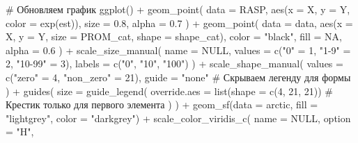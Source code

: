 \documentclass[
  letterpaper,
  DIV=11,
  numbers=noendperiod]{scrreprt}
\newenvironment{Shaded}{\begin{snugshade}}{\end{snugshade}}
\newcommand{\AttributeTok}[1]{\textcolor[rgb]{0.40,0.45,0.13}{#1}}
\newcommand{\CommentTok}[1]{\textcolor[rgb]{0.37,0.37,0.37}{#1}}
\newcommand{\ConstantTok}[1]{\textcolor[rgb]{0.56,0.35,0.01}{#1}}
\newcommand{\DecValTok}[1]{\textcolor[rgb]{0.68,0.00,0.00}{#1}}
\newcommand{\FloatTok}[1]{\textcolor[rgb]{0.68,0.00,0.00}{#1}}
\newcommand{\FunctionTok}[1]{\textcolor[rgb]{0.28,0.35,0.67}{#1}}
\newcommand{\NormalTok}[1]{\textcolor[rgb]{0.00,0.23,0.31}{#1}}
\newcommand{\OtherTok}[1]{\textcolor[rgb]{0.00,0.23,0.31}{#1}}
\newcommand{\SpecialCharTok}[1]{\textcolor[rgb]{0.37,0.37,0.37}{#1}}
\newcommand{\StringTok}[1]{\textcolor[rgb]{0.13,0.47,0.30}{#1}}
\begin{document}
\begin{Shaded}
\begin{Highlighting}[]
\CommentTok{\# Обновляем график}
\FunctionTok{ggplot}\NormalTok{() }\SpecialCharTok{+}
  \FunctionTok{geom\_point}\NormalTok{(}
    \AttributeTok{data =}\NormalTok{ RASP, }
    \FunctionTok{aes}\NormalTok{(}\AttributeTok{x =}\NormalTok{ X, }\AttributeTok{y =}\NormalTok{ Y, }\AttributeTok{color =} \FunctionTok{exp}\NormalTok{(est)), }
    \AttributeTok{size =} \FloatTok{0.8}\NormalTok{, }
    \AttributeTok{alpha =} \FloatTok{0.7}
\NormalTok{  ) }\SpecialCharTok{+} 
  \FunctionTok{geom\_point}\NormalTok{(}
    \AttributeTok{data =}\NormalTok{ data, }
    \FunctionTok{aes}\NormalTok{(}\AttributeTok{x =}\NormalTok{ X, }\AttributeTok{y =}\NormalTok{ Y, }\AttributeTok{size =}\NormalTok{ PROM\_cat, }\AttributeTok{shape =}\NormalTok{ shape\_cat),}
    \AttributeTok{color =} \StringTok{"black"}\NormalTok{, }
    \AttributeTok{fill =} \ConstantTok{NA}\NormalTok{, }
    \AttributeTok{alpha =} \FloatTok{0.6}
\NormalTok{  ) }\SpecialCharTok{+}
  \FunctionTok{scale\_size\_manual}\NormalTok{(}
    \AttributeTok{name =} \ConstantTok{NULL}\NormalTok{,}
    \AttributeTok{values =} \FunctionTok{c}\NormalTok{(}\StringTok{"0"} \OtherTok{=} \DecValTok{1}\NormalTok{, }\StringTok{"1{-}9"} \OtherTok{=} \DecValTok{2}\NormalTok{, }\StringTok{"10{-}99"} \OtherTok{=} \DecValTok{3}\NormalTok{),}
    \AttributeTok{labels =} \FunctionTok{c}\NormalTok{(}\StringTok{"0"}\NormalTok{, }\StringTok{"10"}\NormalTok{, }\StringTok{"100"}\NormalTok{)}
\NormalTok{  ) }\SpecialCharTok{+}
  \FunctionTok{scale\_shape\_manual}\NormalTok{(}
    \AttributeTok{values =} \FunctionTok{c}\NormalTok{(}\StringTok{"zero"} \OtherTok{=} \DecValTok{4}\NormalTok{, }\StringTok{"non\_zero"} \OtherTok{=} \DecValTok{21}\NormalTok{),}
    \AttributeTok{guide =} \StringTok{"none"} \CommentTok{\# Скрываем легенду для формы}
\NormalTok{  ) }\SpecialCharTok{+}
  \FunctionTok{guides}\NormalTok{(}
    \AttributeTok{size =} \FunctionTok{guide\_legend}\NormalTok{(}
      \AttributeTok{override.aes =} \FunctionTok{list}\NormalTok{(}\AttributeTok{shape =} \FunctionTok{c}\NormalTok{(}\DecValTok{4}\NormalTok{, }\DecValTok{21}\NormalTok{, }\DecValTok{21}\NormalTok{)) }\CommentTok{\# Крестик только для первого элемента}
\NormalTok{    )}
\NormalTok{  ) }\SpecialCharTok{+}
  \FunctionTok{geom\_sf}\NormalTok{(}\AttributeTok{data =}\NormalTok{ arctic, }\AttributeTok{fill =} \StringTok{"lightgrey"}\NormalTok{, }\AttributeTok{color =} \StringTok{"darkgrey"}\NormalTok{) }\SpecialCharTok{+}
  \FunctionTok{scale\_color\_viridis\_c}\NormalTok{(}
    \AttributeTok{name =} \ConstantTok{NULL}\NormalTok{,}
    \AttributeTok{option =} \StringTok{"H"}\NormalTok{, }

\end{Highlighting}
\end{Shaded}
\end{document}
